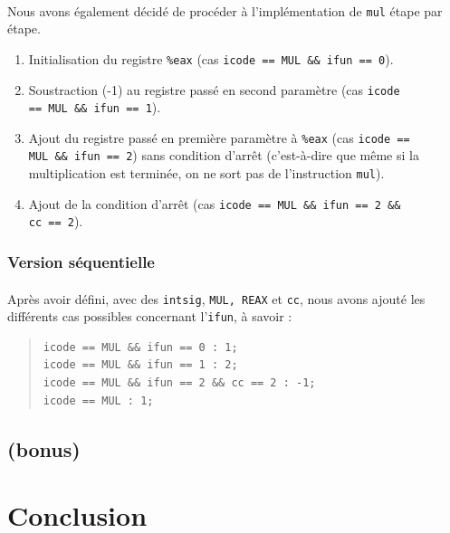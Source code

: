 \documentclass[12pt]{article}
\begin{document}
\paragraph{}Nous avons également décidé de procéder à l'implémentation de \verb+mul+ étape par étape.
\begin{enumerate}
\item Initialisation du registre \verb+%eax+ (cas \verb+icode == MUL && ifun == 0+).
\item Soustraction (-1) au registre passé en second paramètre (cas \verb+icode+
  \\\verb+== MUL && ifun == 1+).
\item Ajout du registre passé en première paramètre à \verb+%eax+ (cas \verb+icode ==+
  \\\verb+MUL && ifun == 2+) sans condition d'arrêt (c'est-à-dire que même si la multiplication est terminée, on ne sort pas de l'instruction \verb+mul+).
\item Ajout de la condition d'arrêt (cas \verb+icode == MUL && ifun == 2 &&+
  \\\verb+cc == 2+).
\end{enumerate}

\subsubsection{Version séquentielle}
\paragraph{}Après avoir défini, avec des \verb+intsig+, \verb+MUL, REAX+ et \verb+cc+, nous avons ajouté les différents cas possibles concernant l'\verb+ifun+, à savoir :
\begin{quote}
\begin{verbatim}
icode == MUL && ifun == 0 : 1;
icode == MUL && ifun == 1 : 2;
icode == MUL && ifun == 2 && cc == 2 : -1;
icode == MUL : 1;
\end{verbatim}
\end{quote}

\subsection{(bonus)}
\section*{Conclusion}
\end{document}

